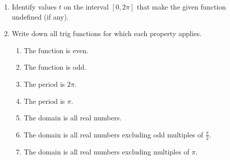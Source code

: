 \begin{enumerate}
\newpage
\item Identify values $t$ on the interval $[0,2\pi]$ that make the given function undefined (if any).
\begin{enumerate}
\end{enumerate}

\item Write down all trig functions for which each property applies.
\begin{enumerate}
\item The function is even.\vfill
\item The function is odd.\vfill
\item The period is $2\pi$.\vfill
\item The period is $\pi$.\vfill
\item The domain is all real numbers.\vfill
\item The domain is all real numbers excluding odd multiples of $\frac{\pi}{2}$.\vfill
\item The domain is all real numbers excluding multiples of $\pi$.\vfill
\end{enumerate}
\newpage


\end{enumerate}
